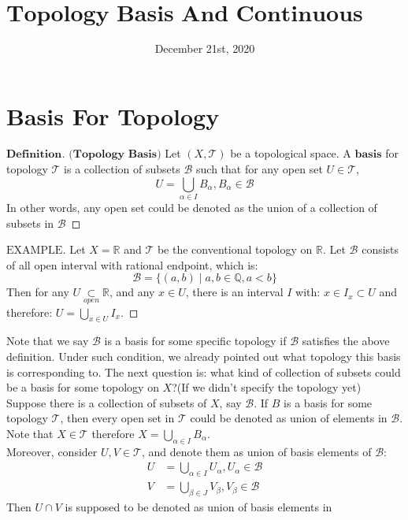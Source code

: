 \documentclass[a4paper, 11pt]{article}
\title{$\textbf{Topology Basis And Continuous Functions}$}
\date{December 21st, 2020}
\theoremstyle{remark}
\newenvironment{mydef}
{\renewcommand\qedsymbol{$ $}\begin{proof}[$\mathbf{Definition}$]}
  {\end{proof}}
\newenvironment{myexam}
{\renewcommand\qedsymbol{$ $}\begin{proof}[$\mathrm{EXAMPLE}$]}
  {\end{proof}}
\theoremstyle{definition}
\begin{document}
       \maketitle 
\section{Basis For Topology}
\begin{mydef}$\textbf{(Topology Basis)}$ Let $(X,\mathcal{T})$ be a topological 
        space. A $\textbf{basis}$ for topology $\mathcal{T}$ is a collection
        of subsets $\mathcal{B}$ such that for any open set $U\in \mathcal{T}$,
        $$
        U=\bigcup_{\alpha\in I} B_{\alpha}, B_{\alpha}\in \mathcal{B}
        $$ In other words, any open set could be denoted as the union of a 
        collection of subsets in $\mathcal{B}$
\end{mydef}
\vspace{0.5cm}
\begin{myexam}
       Let $X=\mathbb{R}$ and $\mathcal{T}$ be the conventional topology on 
       $\mathbb{R}$. Let $\mathcal{B}$ consists of all open interval with 
       rational endpoint, which is:
        $$
        \mathcal{B}=\{(a,b)\mid a,b\in \mathbb{Q},a<b\}
        $$ Then for any $\displaystyle U \underset{open}{\subset} \mathbb{R}$, 
        and any $x\in U$, there is an interval $I$ with: $x\in I_x\subset U$ and
        therefore: $\displaystyle U=\bigcup_{x\in U} I_x$.
\end{myexam}
\vspace{0.5cm}
Note that we say $\mathcal{B}$ is a basis for some specific topology if 
$\mathcal{B}$ satisfies the above definition. Under such condition, we already 
pointed out what topology this basis is corresponding to.
The next question is: what kind of
collection of subsets could be a basis for some topology on $X$?(If we didn't
specify the topology yet)\\
\indent
Suppose there is a collection of subsets of $X$, say $\mathcal{B}$. If $B$ is 
a basis for some topology $\mathcal{T}$, then every open set in $\mathcal{T}$
could be denoted as union of elements in $\mathcal{B}$. Note that 
$X\in \mathcal{T}$ therefore $X=\displaystyle \bigcup_{\alpha\in I}B_{\alpha}$.\\
\indent
Moreover, consider $U,V\in \mathcal{T}$, and denote them as union of basis 
elements of $\mathcal{B}$:
$$
\begin{aligned}
        U&=\bigcup_{\alpha\in I}U_{\alpha},U_{\alpha}\in \mathcal{B}\\
        V&=\bigcup_{\beta\in J}V_{\beta},V_{\beta}\in \mathcal{B}
\end{aligned}
$$ Then $U\cap V$ is supposed to be denoted as union of basis elements in 
\end{document}
